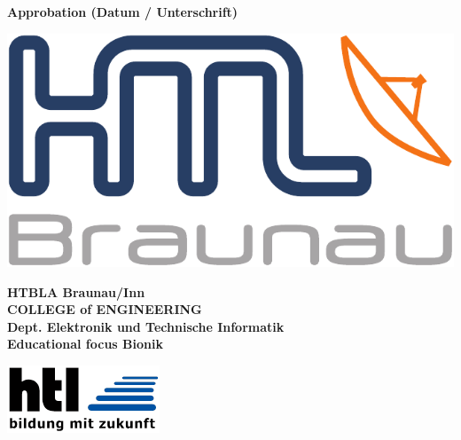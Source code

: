 \vspace*{\fill}

\textbf{Approbation (Datum / Unterschrift)}





\pagebreak
\thispagestyle{empty}

\begin{minipage}[c]{0.20\linewidth}
\includegraphics[width=0.8\linewidth]{media/images/htl_c_cmyk_rein}
\end{minipage}
\begin{minipage}[c]{0.6\linewidth}
\begin{center}
{\bfseries\sffamily\large HTBLA Braunau/Inn\\
COLLEGE of ENGINEERING\\
Dept. Elektronik und Technische Informatik\\
{\normalsize Educational focus Bionik} }
\end{center}
\end{minipage}
\begin{minipage}[c]{0.2\linewidth}
\hfill \includegraphics[width=0.8\linewidth]{media/images/htl-bildung-mit-zukunft}
\end{minipage}\\


